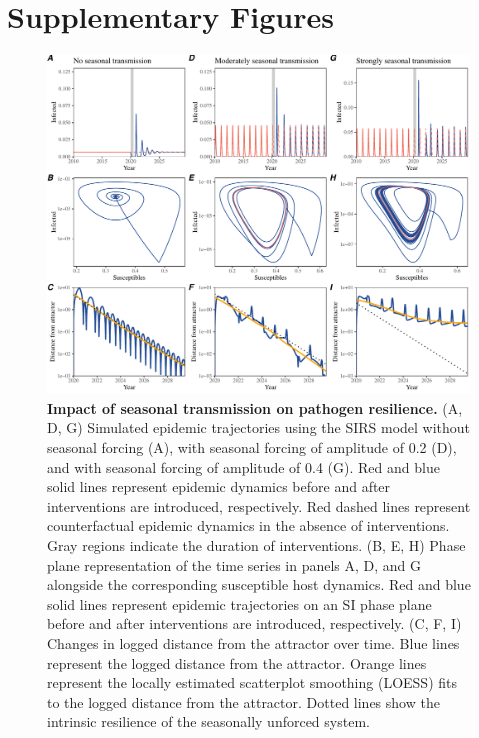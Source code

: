 \documentclass[12pt]{article}
\begin{document}
\pagebreak

\section*{Supplementary Figures}

\begin{figure}[!th]
\includegraphics[width=\textwidth]{../figure2/figure2_simple_seas.pdf}
\caption{
\textbf{Impact of seasonal transmission on pathogen resilience.}
(A, D, G) Simulated epidemic trajectories using the SIRS model without seasonal forcing (A), with seasonal forcing of amplitude of 0.2 (D), and with seasonal forcing of amplitude of 0.4 (G).
Red and blue solid lines represent epidemic dynamics before and after interventions are introduced, respectively.
Red dashed lines represent counterfactual epidemic dynamics in the absence of interventions.
Gray regions indicate the duration of interventions.
(B, E, H) Phase plane representation of the time series in panels A, D, and G alongside the corresponding susceptible host dynamics.
Red and blue solid lines represent epidemic trajectories on an SI phase plane before and after interventions are introduced, respectively.
(C, F, I) Changes in logged distance from the attractor over time.
Blue lines represent the logged distance from the attractor.
Orange lines represent the locally estimated scatterplot smoothing (LOESS) fits to the logged distance from the attractor.
Dotted lines show the intrinsic resilience of the seasonally unforced system.
}
\end{figure}
\end{document}
